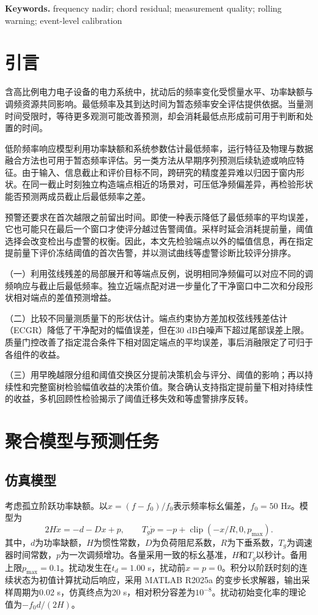 \documentclass[UTF8,a4paper,11pt]{ctexart}
\begin{document}
\noindent\textbf{Keywords.} frequency nadir; chord residual; measurement quality; rolling warning; event-level calibration

\section{引言}
含高比例电力电子设备的电力系统中，扰动后的频率变化受惯量水平、功率缺额与调频资源共同影响\cite{wang2023,sun2020,dai2026}。最低频率及其到达时间为暂态频率安全评估提供依据。当量测时间受限时，等待更多观测可能改善预测，却会消耗最低点形成前可用于判断和处置的时间。

低阶频率响应模型利用功率缺额和系统参数估计最低频率\cite{anderson1990,liu2020,zhao2025,luo2019}，运行特征及物理与数据融合方法也可用于暂态频率评估\cite{wang2018,li2021,zhang2025,li2024fusion}。另一类方法从早期序列预测后续轨迹或响应特征\cite{zhang2019,lu2024,chamorro2021}。由于输入、信息截止和评价目标不同，跨研究的精度差异难以归因于窗内形状。在同一截止时刻独立构造端点相近的场景对，可压低净频偏差异，再检验形状能否预测两成员截止后最低频率之差。

预警还要求在首次越限之前留出时间。即使一种表示降低了最低频率的平均误差，它也可能只在最后一个窗口才使评分越过告警阈值。采样时延会消耗提前量\cite{rietveld}，阈值选择会改变检出与虚警的权衡\cite{rigollet}。因此，本文先检验端点以外的幅值信息，再在指定提前量下评价冻结阈值的首次告警，并以测试曲线等虚警诊断比较评分排序。

（一）利用弦线残差的局部展开和等端点反例，说明相同净频偏可以对应不同的调频响应与截止后最低频率。独立近端点配对进一步量化了干净窗口中二次和分段形状相对端点的差值预测增益。

（二）比较不同量测质量下的形状估计。端点约束协方差加权弦线残差估计（ECGR）降低了干净配对的幅值误差，但在30 dB白噪声下超过尾部误差上限。质量门控改善了指定混合条件下相对固定端点的平均误差，事后消融限定了可归于各组件的收益。

（三）用早晚越限分组和阈值交换区分提前决策机会与评分、阈值的影响；再以持续性和完整窗树检验幅值收益的决策价值。聚合确认支持指定提前量下相对持续性的收益，多机回顾性检验揭示了阈值迁移失效和等虚警排序反转。

\section{聚合模型与预测任务}
\subsection{仿真模型}
考虑孤立阶跃功率缺额。以$x=(f-f_0)/f_0$表示频率标幺偏差，$f_0=50$ Hz。模型为
\begin{equation}
2H\dot{x}=-d-Dx+p,\qquad
T_g\dot p=-p+\operatorname{clip}(-x/R,0,p_{\max}).
\label{eq:model}
\end{equation}
其中，$d$为功率缺额，$H$为惯性常数，$D$为负荷阻尼系数，$R$为下垂系数，$T_g$为调速器时间常数，$p$为一次调频增功。各量采用一致的标幺基准，$H$和$T_g$以秒计。备用上限$p_{\max}=0.1$。扰动发生在$t_d=1.00$ s，扰动前$x=p=0$。积分以阶跃时刻的连续状态为初值计算扰动后响应，采用 MATLAB R2025a 的变步长求解器，输出采样周期为0.02 s，仿真终点为20 s，相对积分容差为$10^{-8}$。扰动初始变化率的理论值为$-f_0d/(2H)$。
\end{document}
